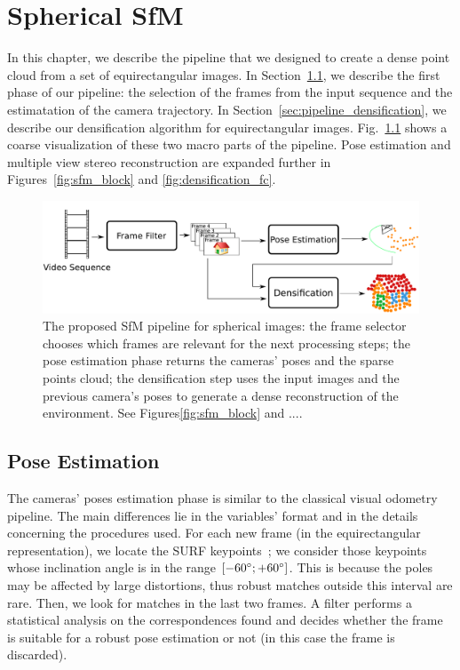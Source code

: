\chapter{Spherical SfM}
In this chapter, we describe the pipeline that we designed to create a dense 
point cloud from a set of equirectangular images.
In Section~\ref{sec:pipeline_pose_estimation}, we describe the first phase of our
pipeline: the selection of the frames from the input sequence and the estimatation of
the camera trajectory. In Section~\ref{sec:pipeline_densification}, we describe 
our densification algorithm for equirectangular images.
Fig.~\ref{fig:pipeline_overview} shows a coarse visualization of these two macro parts of the 
pipeline. Pose estimation and multiple view stereo reconstruction are 
expanded further in Figures~\ref{fig:sfm_block} and \ref{fig:densification_fc}.

\begin{figure}
    \centering
    \includegraphics[width=0.8\linewidth]{img/pipeline_overview.pdf}
    \caption{The proposed SfM pipeline for spherical images: the frame selector chooses which frames are 
    relevant for the next processing steps; the pose estimation phase returns the cameras' 
    poses and the sparse points cloud; the densification step uses 
    the input images and the previous camera's poses to generate a dense
    reconstruction of the environment. See Figures\ref{fig:sfm_block} and ....}
	\label{fig:pipeline_overview}
\end{figure}

\section{Pose Estimation}
\label{sec:pipeline_pose_estimation}
The cameras' poses estimation phase is similar to the classical visual 
odometry pipeline. The main differences lie in the variables' format and in 
the details concerning the procedures used.
For each new frame (in the equirectangular representation), we locate the
SURF keypoints~\cite{bay2006surf}; we consider those keypoints whose inclination angle is in the range $[-60\degree; +60\degree]$. This is because the poles may be affected by large 
distortions, thus robust matches outside this interval are rare.
Then, we look for matches in the last two frames. A filter performs a 
statistical analysis on the correspondences found and decides whether the frame 
is suitable for a robust pose estimation or not (in this case the frame is 
discarded).

